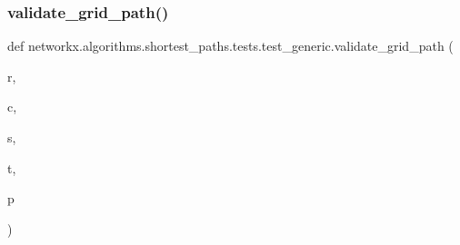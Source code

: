 \subsubsection{\texorpdfstring{validate\+\_\+grid\+\_\+path()}{validate\_grid\_path()}}
{\footnotesize\ttfamily def networkx.\+algorithms.\+shortest\+\_\+paths.\+tests.\+test\+\_\+generic.\+validate\+\_\+grid\+\_\+path (\begin{DoxyParamCaption}\item[{}]{r,  }\item[{}]{c,  }\item[{}]{s,  }\item[{}]{t,  }\item[{}]{p }\end{DoxyParamCaption})}

